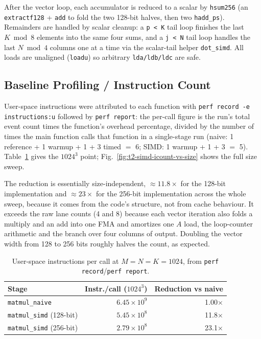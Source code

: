 \documentclass[11pt]{article}
\begin{document}
After the vector loop, each accumulator is reduced to a scalar by
\texttt{hsum256} (an \texttt{extractf128} + \texttt{add} to fold the two
128-bit halves, then two \texttt{hadd\_ps}). Remainders are handled by scalar
cleanup: a \texttt{p < K} tail loop finishes the last $K \bmod 8$ elements into
the same four sums, and a \texttt{j < N} tail loop handles the last
$N \bmod 4$ columns one at a time via the scalar-tail helper \texttt{dot\_simd}.
All loads are unaligned (\texttt{loadu}) so arbitrary \texttt{lda/ldb/ldc} are safe.

\subsection{Baseline Profiling / Instruction Count}

User-space instructions were attributed to each function with
\texttt{perf record -e instructions:u} followed by \texttt{perf report}: the
per-call figure is the run's total event count times the function's overhead
percentage, divided by the number of times the main function calls that function in
a single-stage run (naive: 1 reference + 1 warmup + 1 + 3 timed ${}={}$ 6;
SIMD: 1 warmup + 1 + 3 ${}={}$ 5). Table~\ref{tab:t2-simd-icount} gives the
$1024^3$ point; Fig.~\ref{fig:t2-simd-icount-vs-size} shows the full size
sweep.

The reduction is essentially size-independent, $\approx 11.8\times$ for the
128-bit implementation and $\approx 23\times$ for the 256-bit implementation across the whole
sweep, because it comes from the code's structure, not from cache
behaviour. It exceeds the raw lane counts (4 and 8) because each vector
iteration also folds a multiply and an add into one FMA and amortizes one
$A$ load, the loop-counter arithmetic and the branch over four columns of
output. Doubling the vector width from 128 to 256 bits roughly halves the
count, as expected.

\begin{table}[H]
    \centering
    \begin{tabular}{lrr}
        \toprule
        \textbf{Stage} & \textbf{Instr./call ($1024^3$)} & \textbf{Reduction vs naive} \\
        \midrule
        \texttt{matmul\_naive}          & $6.45\times10^{9}$ & 1.00$\times$ \\
        \texttt{matmul\_simd} (128-bit)  & $5.45\times10^{8}$ & 11.8$\times$ \\
        \texttt{matmul\_simd} (256-bit)  & $2.79\times10^{8}$ & 23.1$\times$ \\
        \bottomrule
    \end{tabular}
    \caption{User-space instructions per call at $M{=}N{=}K{=}1024$,
    from \texttt{perf record}/\texttt{perf report}.}
    \label{tab:t2-simd-icount}
\end{table}
\end{document}
